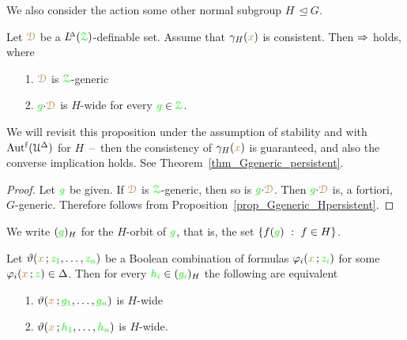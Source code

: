 We also consider the action some other normal subgroup \emph{$H$\/}$\,\trianglelefteq G$.

\def\medrel#1{\parbox[t]{5ex}{$\displaystyle\hfil #1$}}
\def\ceq#1#2#3{\parbox[t]{6ex}{$\displaystyle #1$}\medrel{#2}{$\displaystyle #3$}}

\begin{proposition}\label{prop_Ggeneric_persistent}
  Let ${\color{brown}\EuScript D}$ be a $L\kern-.5ex^{\scriptscriptstyle\Delta}({\color{green}\EuScript Z})$-definable set.
  Assume that $\gamma_H({\color{brown} x})$ is consistent.
  Then $\Rightarrow$ holds, where
  \begin{itemize}
    \item [1.] ${\color{brown}\EuScript D}$ is ${\color{green}\EuScript Z}$-generic
    \item [2.] ${\color{green} g}{\cdot}{\color{brown}\EuScript D}$ is $H$-wide for every ${\color{green} g}\in{\color{green}\EuScript Z}$.
  \end{itemize}
\end{proposition}

We will revisit this proposition under the assumption of stability and with $\mbox{Aut$^{\rm f}$}(\EuScript U^\Delta)$ for $H$~--~then the consistency of $\gamma_H({\color{brown} x})$ is guaranteed, and also the converse implication holds.
See Theorem~\ref{thm_Ggeneric_persistent}.\vspace*{-0.5\baselineskip}
%
\begin{proof}
  Let ${\color{green} g}$ be given.
  If ${\color{brown}\EuScript D}$ is ${\color{green}\EuScript Z}$-generic, then so is ${\color{green} g}{\cdot}{\color{brown}\EuScript D}$.
  Then ${\color{green} g}{\cdot}{\color{brown}\EuScript D}$ is, a fortiori, $G$-generic.
  Therefore  follows from Proposition~\ref{prop_Ggeneric_Hpersistent}.
\end{proof}

We write \emph{$({\color{green} g})_H$\/} for the $H$-orbit of ${\color{green} g}$, that is, the set $\{f({\color{green} g})\ :\ f\in H\}$.

\begin{proposition}\label{prop_wideHcojugate}
  Let $\vartheta({\color{brown} x}\,;{\color{green} z_1},\dots,{\color{green} z_n})$ be a Boolean combination of formulas $\varphi_i({\color{brown} x}\,;{\color{green} z_i})$ for some $\varphi_i({\color{brown} x}\,;{\color{green} z})\in\Delta$.
  Then for every ${\color{green} h_i}\in({\color{green} g_i})_H$ the following are equivalent
  \begin{itemize}
    \item [1.] $\vartheta({\color{brown} x}\,;{\color{green} g_1},\dots,{\color{green} g_n})$ is $H$-wide
    \item [2.] $\vartheta({\color{brown} x}\,;{\color{green} h_1},\dots,{\color{green} h_n})$ is $H$-wide.
  \end{itemize}
\end{proposition}

